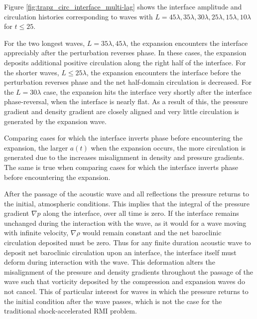 Figure \ref{fig:trapz_circ_interface_multi-lag} shows the interface
amplitude and circulation histories corresponding to waves with
$L=45\lambda, 35\lambda ,30\lambda ,25\lambda ,15\lambda ,10\lambda$
for $t\leq 25$.


For the two longest waves, $L=35\lambda, 45\lambda$, the expansion
encounters the interface appreciably after the perturbation reverses
phase. In these cases, the expansion deposits additional positive
circulation along the right half of the interface. For the shorter
waves, $L \leq 25\lambda$, the expansion encounters the interface
before the perturbation reverses phase and the net half-domain
circulation is decreased. For the $L=30\lambda$ case, the expansion
hits the interface very shortly after the interface phase-reversal,
when the interface is nearly flat. As a result of this, the pressure
gradient and density gradient are closely aligned and very little
circulation is generated by the expansion wave.

Comparing cases for which the interface inverts phase before
encountering the expansion, the larger $a(t)$ when the expansion
occurs, the more circulation is generated due to the increases
misalignment in density and pressure gradients. The same is true when
comparing cases for which the interface inverts phase before
encountering the expansion.

After the passage of the acoustic wave and all reflections the
pressure returns to the initial, atmospheric conditions. This implies
that the integral of the pressure gradient $\nabla p$ along the
interface, over all time is zero. If the interface remains unchanged
during the interaction with the wave, as it would for a wave moving
with infinite velocity, $\nabla \rho$ would remain constant and the
net baroclinic circulation deposited must be zero. Thus for any finite
duration acoustic wave to deposit net baroclinic circulation upon an
interface, the interface itself must deform during interaction with
the wave. This deformation alters the misalignment of the pressure and
density gradients throughout the passage of the wave such that
vorticity deposited by the compression and expansion waves do not
cancel. This of particular interest for waves in which the
pressure returns to the initial condition after the wave passes, which
is not the case for the traditional shock-accelerated \ac{RMI}
problem.

